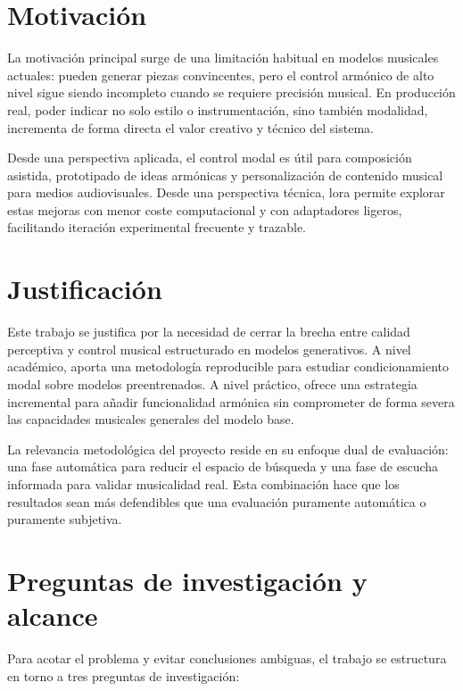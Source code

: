 \documentclass[%
    school=etsisi,%
    type=pfg,%
    degree=61CD,%
]{upm-report}
\begin{document}
\section{Motivaci\'on}
\label{s:motivacion}

La motivaci\'on principal surge de una limitaci\'on habitual en modelos musicales actuales: pueden generar piezas convincentes, pero el control arm\'onico de alto nivel sigue siendo incompleto cuando se requiere precisi\'on musical. En producci\'on real, poder indicar no solo estilo o instrumentaci\'on, sino tambi\'en modalidad, incrementa de forma directa el valor creativo y t\'ecnico del sistema.

Desde una perspectiva aplicada, el control modal es \'util para composici\'on asistida, prototipado de ideas arm\'onicas y personalizaci\'on de contenido musical para medios audiovisuales. Desde una perspectiva t\'ecnica, \gls{lora} permite explorar estas mejoras con menor coste computacional y con adaptadores ligeros, facilitando iteraci\'on experimental frecuente y trazable.

\section{Justificaci\'on}

Este trabajo se justifica por la necesidad de cerrar la brecha entre calidad perceptiva y control musical estructurado en modelos generativos. A nivel acad\'emico, aporta una metodolog\'ia reproducible para estudiar condicionamiento modal sobre modelos preentrenados. A nivel pr\'actico, ofrece una estrategia incremental para a\~nadir funcionalidad arm\'onica sin comprometer de forma severa las capacidades musicales generales del modelo base.

La relevancia metodol\'ogica del proyecto reside en su enfoque dual de evaluaci\'on: una fase autom\'atica para reducir el espacio de b\'usqueda y una fase de escucha informada para validar musicalidad real. Esta combinaci\'on hace que los resultados sean m\'as defendibles que una evaluaci\'on puramente autom\'atica o puramente subjetiva.

\section{Preguntas de investigaci\'on y alcance}

Para acotar el problema y evitar conclusiones ambiguas, el trabajo se estructura en torno a tres preguntas de investigaci\'on:
\end{document}
